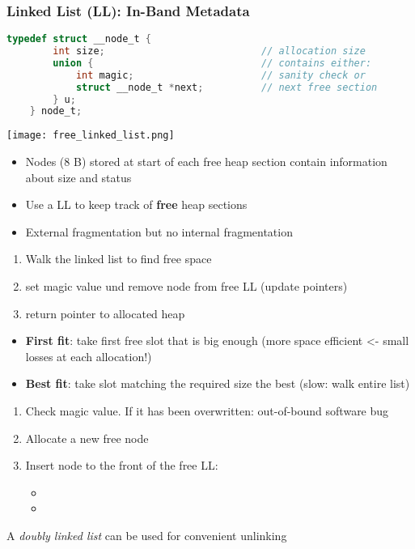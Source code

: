 \subsubsection{Linked List (LL): In-Band Metadata}

\begin{lstlisting}[language={C}]
    typedef struct __node_t {
        int size;                           // allocation size
        union {                             // contains either:
            int magic;                      // sanity check or
            struct __node_t *next;          // next free section
        } u;
    } node_t;         
    \end{lstlisting}

\texttt{[image: free\_linked\_list.png]}

\begin{itemize}
    \item Nodes (8 B) stored at start of each free heap section contain information about size and status
    \item Use a LL to keep track of \textbf{free} heap sections
    \item External fragmentation but no internal fragmentation
\end{itemize}

\newpar{}
\begin{enumerate}
    \item Walk the linked list to find free space
    \item set magic value und remove node from free LL (update pointers)
    \item return pointer to allocated heap
\end{enumerate}

\newpar{}
\begin{itemize}
    \item \textbf{First fit}: take first free slot that is big enough (more space efficient <- small losses at each allocation!) %
    \item \textbf{Best fit}: take slot matching the required size the best (slow: walk entire list)
\end{itemize}

\newpar{}

\begin{enumerate}
    \item Check magic value. If it has been overwritten: out-of-bound software bug
    \item Allocate a new free node
    \item Insert node to the front of the free LL:
          \begin{itemize}
              \item {}
              \item {}
          \end{itemize}
\end{enumerate}
A \textit{doubly linked list} can be used for convenient unlinking

